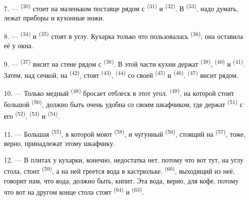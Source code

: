 7. ---  \textsuperscript{(30)} стоит на маленьком поставце рядом
с  \textsuperscript{(31)} и 
\textsuperscript{(32)}. В  \textsuperscript{(33)}, надо думать, лежат
приборы и кухонные ножи.

8. ---  \textsuperscript{(34)} и 
\textsuperscript{(35)} стоят в углу. Кухарка только что пользовалась
 \textsuperscript{(36)}; она оставила её у окна.

9. ---  \textsuperscript{(37)} висит на стене рядом с
 \textsuperscript{(38)}. В этой части кухни держат
 \textsuperscript{(39)},  \textsuperscript{(40)} и
 \textsuperscript{(41)}. Затем, над сечкой, на
 \textsuperscript{(42)}, стоят  \textsuperscript{(43)},
 \textsuperscript{(44)} со своей 
\textsuperscript{(45)} и  \textsuperscript{(46)}. 
\textsuperscript{(47)} висит рядом.

10. --- Только медный  \textsuperscript{(48)} бросает отблеск в этот
угол.  \textsuperscript{(49)}, на которой стоит большой
 \textsuperscript{(50)}, должно быть очень удобна со своим
шкафчиком, где держат  \textsuperscript{(51)} с его
 \textsuperscript{(52)}, 
\textsuperscript{(53)} и  \textsuperscript{(54)}.

\VUsaut{4.0mm}
\VUsaut{3.0mm}

11. --- Большая  \textsuperscript{(55)}, в которой моют
 \textsuperscript{(58)}, и чугунный  \textsuperscript{(56)},
стоящий на  \textsuperscript{(57)}, тоже, верно,
принадлежат этому шкафчику.

12. --- В плитах у кухарки, конечно, недостатка нет, потому что вот тут,
на углу стола, стоит  \textsuperscript{(59)}, а на ней
греется вода в кастрюльке.  \textsuperscript{(60)}, выходящий из неё,
говорит нам, что вода, должно быть, кипит. Эта вода, верно, для кофе,
потому что вот на другом конце стола стоят 
\textsuperscript{(64)} и  \textsuperscript{(63)}.

